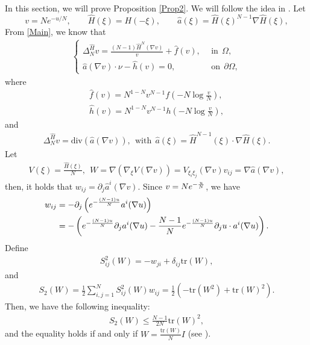 \documentclass[10pt,a4paper]{amsart}
\numberwithin{equation}{section}
\newcommand{\pa}{\partial}
\newcommand{\e}{\textup{e}}
\begin{document}
In this section, we will prove Proposition \ref{Prop2}. We will follow the idea in \cite{CCR2021}. Let
\[
       v=Ne^{-u/N},\qquad \widehat H(\xi)=H(-\xi),\qquad
       \widehat a(\xi)=\widehat H(\xi)^{N-1}\nabla\widehat H(\xi),
\]
From \eqref{Main}, we know that
\begin{align}\label{v-equation}
    \begin{cases}
        \Delta_N^{\hat{H}} v = \frac{(N-1)\hat{H}^N(\nabla v)}{v} + \hat{f}(v),  \ \ &\text{in} \ \ \Omega, \\
        \hat{a}(\nabla v) \cdot \nu - \hat{h}(v) = 0 , \ \ &\text{on} \ \ \partial \Omega,
    \end{cases}
\end{align}
where
\begin{align*}
    \hat{f}(v) = N^{1-N} v^{N-1} f\left(-N\log \frac{v}{N}\right), \\  \hat{h}(v) = N^{1-N} v^{N-1} h\left(-N\log \frac{v}{N}\right),
\end{align*}
and
\begin{align*}
    \Delta_N^{\hat{H}} v = \text{div}(\hat{a}(\nabla v)), \ \ \text{with}\ \ \hat{a}(\xi) = \hat{H}^{N -1}(\xi) \cdot \nabla \hat{H}(\xi).
\end{align*}
Let
\begin{align*}
    V(\xi) = \frac{\hat{H}(\xi)}{N} , \ \ W = \nabla(\nabla_{\xi} V(\nabla v)) = V_{\xi_i \xi_j}(\nabla v) v_{ij} = \nabla \hat{a}(\nabla v),
\end{align*}
then, it holds that $ w_{ij} = \partial_j \hat{a}^i(\nabla v) $. Since $ v = N \e^{-\frac{u}{N}}$, we have
\begin{align*}
    w_{ij} & = - \partial_j \left( \e^{-\frac{(N-1)u}{N}} a^i(\nabla u) \right) \\
    & =- \left( \e^{-\frac{(N-1)u}{N}} \pa_ja^i(\nabla u)  - \frac{N-1}{N} \e^{-\frac{(N-1)u}{N}} \pa_j u \cdot a^i(\nabla u)\right).
\end{align*}
Define
\begin{align*}
    S^2_{ij}(W) = - w_{ji} + \delta_{ij} \text{tr}(W),
\end{align*}
and
\begin{align*}
    S_2(W) = \frac{1}{2} \sum_{i,j =1}^N S^2_{ij}(W) w_{ij} = \frac{1}{2}(-\text{tr}(W^2) + \text{tr}(W)^2).
\end{align*}
Then, we have the following  inequality:
\begin{align}\label{Newton}
    S_2(W) \leq \frac{N-1}{2N} \text{tr}(W)^2,
\end{align}
and the equality holds if and only if $W = \frac{\text{tr}(W)}{N} I$ (see \cite{CS2009}).
\end{document}
